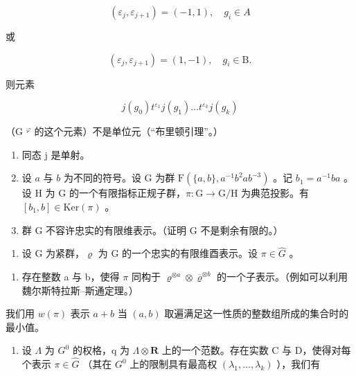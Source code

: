 \[
(\varepsilon_ {j}, \varepsilon_ {j + 1}) = (- 1, 1), \quad g _ {i} \in A
\]

或

\[
(\varepsilon_ {j}, \varepsilon_ {j + 1}) = (1, - 1), \quad g _ {i} \in \mathrm{B}.
\]

则元素

\[
j (g _ {0}) t ^ {\varepsilon_ {1}} j (g _ {1}) \dots t ^ {\varepsilon_ {k}} j (g _ {k})
\]

（G \(^{φ}\) 的这个元素）不是单位元（“布里顿引理”。）

\begin{enumerate}
\def\labelenumi{\alph{enumi})}
\setcounter{enumi}{1}
\item
  同态 j 是单射。
\item
  设 \(a\) 与 \(b\) 为不同的符号。设 G 为群 \(\mathrm{F}(\{a,b\}, a^{-1}b^{2}ab^{-3})\) 。记 \(b_{1} = a^{-1}ba\) 。设 H 为 G 的一个有限指标正规子群，\(\pi: \mathrm{G} \to \mathrm{G}/\mathrm{H}\) 为典范投影。有 \([b_{1}, b] \in \mathrm{Ker}(\pi)\) 。
\item
  群 G 不容许忠实的有限维表示。（证明 G 不是剩余有限的。）
\end{enumerate}

\begin{enumerate}
\def\labelenumi{\arabic{enumi})}
\setcounter{enumi}{4}
\tightlist
\item
  设 G 为紧群，\(\varrho\) 为 G 的一个忠实的有限维酉表示。设 \(\pi \in \widehat{G}\) 。
\end{enumerate}

\begin{enumerate}
\def\labelenumi{\alph{enumi})}
\tightlist
\item
  存在整数 a 与 b，使得 \(\pi\) 同构于 \(\varrho^{\otimes a} \otimes \overline{\varrho}^{\otimes b}\) 的一个子表示。（例如可以利用魏尔斯特拉斯–斯通定理。）
\end{enumerate}

我们用 \(w(\pi)\) 表示 \(a + b\) 当 \((a, b)\) 取遍满足这一性质的整数组所成的集合时的最小值。

\begin{enumerate}
\def\labelenumi{\alph{enumi})}
\setcounter{enumi}{1}
\tightlist
\item
  设 \(\Lambda\) 为 \(G^{0}\) 的权格，q 为 \(\Lambda\otimes \mathbf{R}\) 上的一个范数。存在实数 C 与 D，使得对每个表示 \(\pi\in\widehat{G}\) （其在 \(G^{0}\) 上的限制具有最高权 \((\lambda_{1},\ldots,\lambda_{k})\) ），我们有
\end{enumerate}

